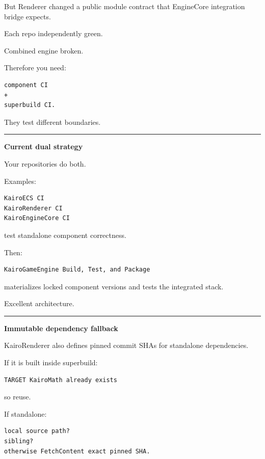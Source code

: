 But Renderer changed a public module contract that EngineCore integration bridge expects.

Each repo independently green.

Combined engine broken.

Therefore you need:

\begin{verbatim}
component CI
+
superbuild CI.
\end{verbatim}

They test different boundaries.

\begin{center}\rule{0.5\linewidth}{0.5pt}\end{center}

\textbf{Current dual strategy}

Your repositories do both.

Examples:

\begin{verbatim}
KairoECS CI
KairoRenderer CI
KairoEngineCore CI
\end{verbatim}

test standalone component correctness.

Then:

\begin{verbatim}
KairoGameEngine Build, Test, and Package
\end{verbatim}

materializes locked component versions and tests the integrated stack.

Excellent architecture.

\begin{center}\rule{0.5\linewidth}{0.5pt}\end{center}

\textbf{Immutable dependency fallback}

KairoRenderer also defines pinned commit SHAs for standalone dependencies.

If it is built inside superbuild:

\begin{verbatim}
TARGET KairoMath already exists
\end{verbatim}

so reuse.

If standalone:

\begin{verbatim}
local source path?
sibling?
otherwise FetchContent exact pinned SHA.
\end{verbatim}

